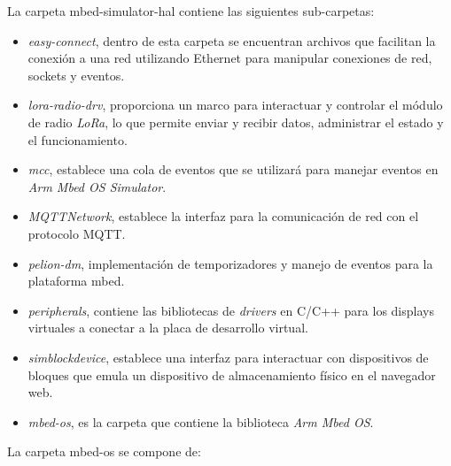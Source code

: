 La carpeta \textquotedbl mbed-simulator-hal\textquotedbl{} contiene las siguientes sub-carpetas: 

\begin{itemize}
    \item \textit{easy-connect}, dentro de esta carpeta se encuentran archivos que facilitan la conexión a una red utilizando Ethernet para manipular conexiones de red, sockets y eventos.

    \item \textit{lora-radio-drv}, proporciona un marco para interactuar y controlar el módulo de radio \textit{LoRa}, lo que permite enviar y recibir datos, administrar el estado y el funcionamiento.

    \item \textit{mcc}, establece una cola de eventos que se utilizará para manejar eventos en \textit{Arm Mbed OS Simulator}. 

    \item \textit{MQTTNetwork}, establece la interfaz para la comunicación de red con el protocolo MQTT. 

    \item \textit{pelion-dm}, implementación de temporizadores y manejo de eventos para la plataforma mbed.

    \item \textit{peripherals}, contiene las bibliotecas de \textit{drivers} en C/C++ para los displays virtuales a conectar a la placa de desarrollo virtual.

    \item \textit{simblockdevice}, establece una interfaz para interactuar con  dispositivos de bloques que emula un dispositivo de almacenamiento físico en el navegador web.

    \item \textit{mbed-os}, es la carpeta que contiene la biblioteca \textit{Arm Mbed OS}.
	
\end{itemize}

La carpeta \textquotedbl mbed-os\textquotedbl{} se compone de: 

